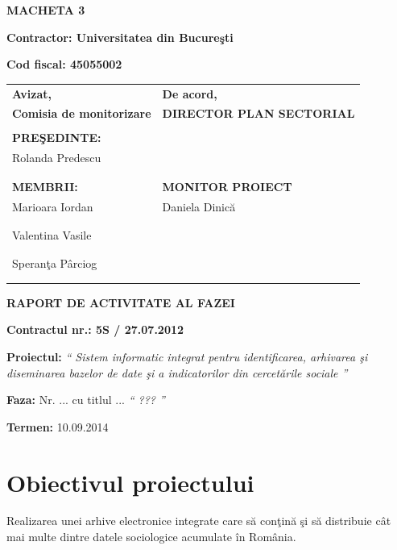 \documentclass[a4paper, 10pt]{article}
\title{}
\author{}
\date{2013-04-08}
\begin{document}
{\raggedleft\bfseries
MACHETA 3
\par}

{\bfseries
Contractor: Universitatea din Bucure\c{s}ti}

{\textbf{Cod fiscal: 45055002}

\bigskip


\begin{tabular}{@{}l l}
\textbf{Avizat,}&\textbf{De acord,}\\
\textbf{Comisia de monitorizare}&\textbf{DIRECTOR PLAN SECTORIAL}\\
\\
\textbf{PRE\c{S}EDINTE:}&\\
Rolanda Predescu&\\
\\
\\
\textbf{MEMBRII:}&\textbf{MONITOR PROIECT}\\
Marioara Iordan&Daniela Dinic\u{a}\\
\\
\\
Valentina Vasile&\\
\\
\\
Speran\c{t}a P\^{a}rciog\\
\\
\\
\end{tabular}

\bigskip

\bigskip

{\centering\bfseries
RAPORT DE ACTIVITATE AL FAZEI
\par}

\bigskip

{\bfseries
Contractul nr.: 5S / 27.07.2012}

{
\textbf{Proiectul: }
\textit{`` Sistem informatic integrat pentru identificarea, arhivarea \c{s}i diseminarea bazelor de date \c{s}i a indicatorilor din
cercet\u{a}rile sociale ''}}

{
\textbf{Faza: }
Nr. ... cu titlul ...
\textit{`` ??? ''}}

{\textbf{Termen:} 10.09.2014}

\medskip

\section{Obiectivul proiectului}

Realizarea unei arhive electronice integrate care s\u{a}
con\c{t}in\u{a} \c{s}i s\u{a} distribuie c\^at mai multe dintre 
datele sociologice acumulate \^in Rom\^ania.

}
\end{document}
